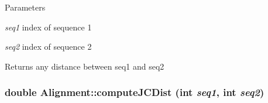 \begin{DoxyParams}{Parameters}
\item[{\em seq1}]index of sequence 1 \item[{\em seq2}]index of sequence 2 \end{DoxyParams}
\begin{DoxyReturn}{Returns}
any distance between seq1 and seq2 
\end{DoxyReturn}
\hypertarget{classAlignment_a0be957c6fb7af20dc675f28969487131}{
\subsubsection[{computeJCDist}]{\setlength{\rightskip}{0pt plus 5cm}double Alignment::computeJCDist (int {\em seq1}, \/  int {\em seq2})}}
\label{classAlignment_a0be957c6fb7af20dc675f28969487131}

